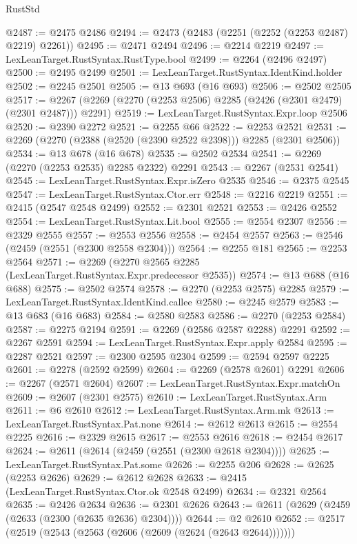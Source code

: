 \begin{lexlean}{RustStd}
\begin{coremodule}
@2487 := @2475 @2486
@2494 := @2473 (@2483 (@2251 (@2252 (@2253 @2487) @2219) @2261))
@2495 := @2471 @2494
@2496 := @2214 @2219
@2497 := LexLeanTarget.RustSyntax.RustType.bool
@2499 := @2264 (@2496 @2497)
@2500 := @2495 @2499
@2501 := LexLeanTarget.RustSyntax.IdentKind.holder
@2502 := @2245 @2501
@2505 := @13 @693 (@16 @693)
@2506 := @2502 @2505
@2517 := @2267 (@2269 (@2270 (@2253 @2506) @2285 (@2426 (@2301 @2479) (@2301 @2487))) @2291)
@2519 := LexLeanTarget.RustSyntax.Expr.loop @2506
@2520 := @2390 @2272
@2521 := @2255 @66
@2522 := @2253 @2521
@2531 := @2269 (@2270 (@2388 (@2520 (@2390 @2522 @2398))) @2285 (@2301 @2506))
@2534 := @13 @678 (@16 @678)
@2535 := @2502 @2534
@2541 := @2269 (@2270 (@2253 @2535) @2285 @2322) @2291
@2543 := @2267 (@2531 @2541)
@2545 := LexLeanTarget.RustSyntax.Expr.isZero @2535
@2546 := @2375 @2545
@2547 := LexLeanTarget.RustSyntax.Ctor.err
@2548 := @2216 @2219
@2551 := @2415 (@2547 @2548 @2499)
@2552 := @2301 @2521
@2553 := @2426 @2552
@2554 := LexLeanTarget.RustSyntax.Lit.bool
@2555 := @2554 @2307
@2556 := @2329 @2555
@2557 := @2553 @2556
@2558 := @2454 @2557
@2563 := @2546 (@2459 (@2551 (@2300 @2558 @2304)))
@2564 := @2255 @181
@2565 := @2253 @2564
@2571 := @2269 (@2270 @2565 @2285 (LexLeanTarget.RustSyntax.Expr.predecessor @2535))
@2574 := @13 @688 (@16 @688)
@2575 := @2502 @2574
@2578 := @2270 (@2253 @2575) @2285
@2579 := LexLeanTarget.RustSyntax.IdentKind.callee
@2580 := @2245 @2579
@2583 := @13 @683 (@16 @683)
@2584 := @2580 @2583
@2586 := @2270 (@2253 @2584)
@2587 := @2275 @2194
@2591 := @2269 (@2586 @2587 @2288) @2291
@2592 := @2267 @2591
@2594 := LexLeanTarget.RustSyntax.Expr.apply @2584
@2595 := @2287 @2521
@2597 := @2300 @2595 @2304
@2599 := @2594 @2597 @2225
@2601 := @2278 (@2592 @2599)
@2604 := @2269 (@2578 @2601) @2291
@2606 := @2267 (@2571 @2604)
@2607 := LexLeanTarget.RustSyntax.Expr.matchOn
@2609 := @2607 (@2301 @2575)
@2610 := LexLeanTarget.RustSyntax.Arm
@2611 := @6 @2610
@2612 := LexLeanTarget.RustSyntax.Arm.mk
@2613 := LexLeanTarget.RustSyntax.Pat.none
@2614 := @2612 @2613
@2615 := @2554 @2225
@2616 := @2329 @2615
@2617 := @2553 @2616
@2618 := @2454 @2617
@2624 := @2611 (@2614 (@2459 (@2551 (@2300 @2618 @2304))))
@2625 := LexLeanTarget.RustSyntax.Pat.some
@2626 := @2255 @206
@2628 := @2625 (@2253 @2626)
@2629 := @2612 @2628
@2633 := @2415 (LexLeanTarget.RustSyntax.Ctor.ok @2548 @2499)
@2634 := @2321 @2564
@2635 := @2426 @2634
@2636 := @2301 @2626
@2643 := @2611 (@2629 (@2459 (@2633 (@2300 (@2635 @2636) @2304))))
@2644 := @2 @2610
@2652 := @2517 (@2519 (@2543 (@2563 (@2606 (@2609 (@2624 (@2643 @2644)))))))

\end{coremodule}
\end{lexlean}
